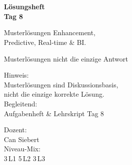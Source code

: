 \documentclass[11pt,a4paper,oneside]{article}
\begin{document}
\begin{titlepage}
  \pagestyle{empty}
  \vspace*{1.5cm}
  \\[2pt]
  \noindent{\color{lpAccent}\rule{\linewidth}{1.2pt}}\\[4pt]

  \vspace{3cm}
  {\sffamily\fontsize{30}{34}\selectfont\bfseries\color{lpInk}L\"osungsheft\\Tag 8\par}

  \vspace{0.7cm}
  {\sffamily\large\color{lpGray}Musterl\"osungen \textendash{} Enhancement,\\Predictive, Real-time \& BI.\par}

  \vspace{1.5cm}
  {\caveatfont\LARGE\color{lpGreen}Musterl\"osungen \textperiodcentered{} nicht die einzige Antwort}\par

  \vfill

  \noindent\begin{minipage}{0.55\linewidth}
    {\sffamily\footnotesize\color{lpGray}Hinweis:}\\
    {\sffamily\small\color{lpInk}Musterl\"osungen sind Diskussionsbasis,\\nicht die einzige korrekte L\"osung.}\\[10pt]
    {\sffamily\footnotesize\color{lpGray}Begleitend:}\\
    {\sffamily\small\color{lpInk}Aufgabenheft \& Lehrskript Tag 8}
  \end{minipage}\hfill
  \begin{minipage}{0.4\linewidth}
    \raggedleft
    {\sffamily\footnotesize\color{lpGray}Dozent:}\\
    {\sffamily\small\color{lpInk}Can Siebert}\\[10pt]
    {\sffamily\footnotesize\color{lpGray}Niveau-Mix:}\\
    {\sffamily\small\color{lpInk}3\,L1 \textperiodcentered{} 5\,L2 \textperiodcentered{} 3\,L3}
  \end{minipage}

  \vspace{0.5cm}
  \noindent{\color{lpAccent}\rule{\linewidth}{0.6pt}}
\end{titlepage}
\end{document}
